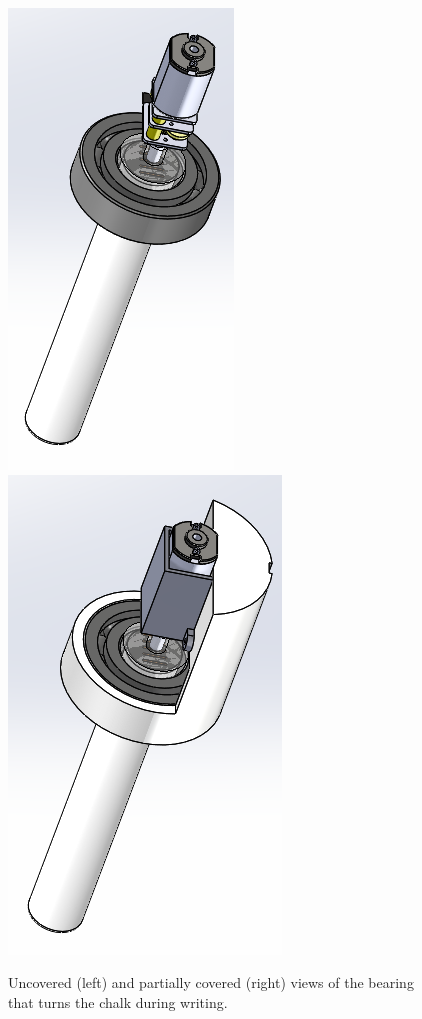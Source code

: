 \begin{figure}
 \centering
 	\includegraphics[width=0.48\columnwidth]{CAD-screen-shots/bearing.PNG}
 	\includegraphics[width=0.48\columnwidth]{CAD-screen-shots/bearing-holder.PNG}
	\caption{Uncovered (left) and partially covered (right) views of the bearing that turns the chalk during writing.}
 \label{fig:chalk-turner}
\end{figure}

